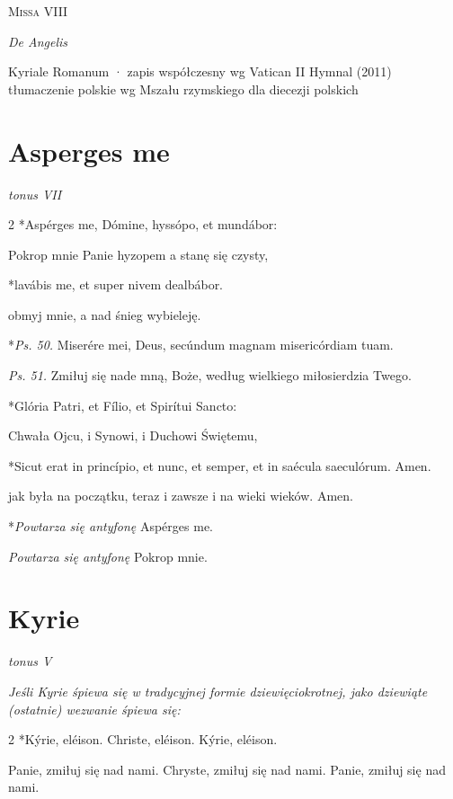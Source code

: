 \documentclass[a4paper,11pt]{article}
\newcommand{\chant}[2]{%
  \section{\foreignlanguage{latin}{#1}}%
  {\centering\small\itshape #2\par}%
  \vspace{0.8ex}}
\newenvironment{tekst}
  {\par\vspace{0.6ex}\small
   \setcolumnwidth{0.48\textwidth,0.48\textwidth}%
   \setlength{\columnsep}{0.04\textwidth}%
   \begin{paracol}{2}}
  {\end{paracol}\par\vspace{0.5ex}}
\newcommand{\w}[2]{%
  \switchcolumn[0]*\foreignlanguage{latin}{#1}\par
  \switchcolumn #2\par\vspace{0.3ex}}
\newcommand{\rubr}[1]{\textcolor{rubric}{\itshape #1}}
\begin{document}
\begin{center}
  {\Huge\scshape Missa VIII}\par\smallskip
  {\Large\itshape De Angelis}\par\smallskip
  {\small Kyriale Romanum · zapis współczesny wg Vatican II Hymnal (2011)\\
   tłumaczenie polskie wg Mszału rzymskiego dla diecezji polskich}
\end{center}

\chant{Asperges me}{tonus VII}
\begin{tekst}
\w{Aspérges me, Dómine, hyssópo, et mundábor:}
  {Pokrop mnie Panie hyzopem a stanę się czysty,}
\w{lavábis me, et super nivem dealbábor.}
  {obmyj mnie, a nad śnieg wybieleję.}
\w{\rubr{Ps. 50.} Miserére mei, Deus, secúndum magnam misericórdiam tuam.}
  {\rubr{Ps. 51.} Zmiłuj się nade mną, Boże, według wielkiego miłosierdzia Twego.}
\w{Glória Patri, et Fílio, et Spirítui Sancto:}
  {Chwała Ojcu, i Synowi, i Duchowi Świętemu,}
\w{Sicut erat in princípio, et nunc, et semper, et in saécula saeculórum. Amen.}
  {jak była na początku, teraz i zawsze i na wieki wieków. Amen.}
\w{\rubr{Powtarza się antyfonę} Aspérges me.}
  {\rubr{Powtarza się antyfonę} Pokrop mnie.}
\end{tekst}

\chant{Kyrie}{tonus V}
\par\smallskip
{\small\itshape\textcolor{rubric}{Jeśli Kyrie śpiewa się w tradycyjnej formie
dziewięciokrotnej, jako dziewiąte (ostatnie) wezwanie śpiewa się:}\par}
\begin{tekst}
\w{Kýrie, eléison. Christe, eléison. Kýrie, eléison.}
  {Panie, zmiłuj się nad nami. Chryste, zmiłuj się nad nami.
   Panie, zmiłuj się nad nami.}
\end{tekst}
\end{document}
